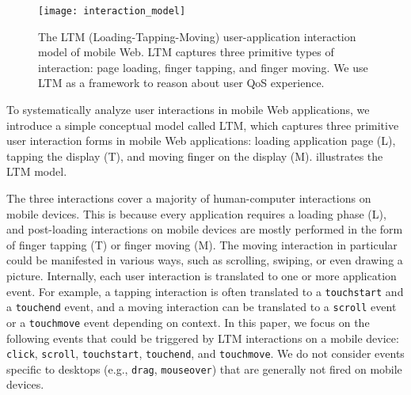 \begin{figure}[t]
  \centering
  \texttt{[image: interaction\_model]}
  \caption{The LTM (Loading-Tapping-Moving) user-application interaction model of mobile Web. LTM captures three primitive types of interaction: page loading, finger tapping, and finger moving. We use LTM as a framework to reason about user QoS experience.}
  \label{fig:interaction}
\end{figure}

To systematically analyze user interactions in mobile Web applications, we introduce a simple conceptual model called LTM, which captures three primitive user interaction forms in mobile Web applications: loading application page (L), tapping the display (T), and moving finger on the display (M).  illustrates the LTM model.

The three interactions cover a majority of human-computer interactions on mobile devices. This is because every application requires a loading phase (L), and post-loading interactions on mobile devices are mostly performed in the form of finger tapping (T) or finger moving (M). The moving interaction in particular could be manifested in various ways, such as scrolling, swiping, or even drawing a picture. Internally, each user interaction is translated to one or more application event. For example, a tapping interaction is often translated to a \texttt{touchstart} and a \texttt{touchend} event, and a moving interaction can be translated to a \texttt{scroll} event or a \texttt{touchmove} event depending on context. In this paper, we focus on the following events that could be triggered by LTM interactions on a mobile device: \texttt{click}, \texttt{scroll}, \texttt{touchstart}, \texttt{touchend}, and \texttt{touchmove}. We do not consider events specific to desktops (e.g., \texttt{drag}, \texttt{mouseover}) that are generally not fired on mobile devices.


